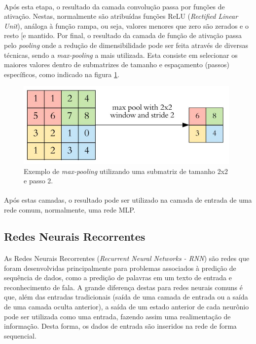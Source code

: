 \documentclass[grad,numbers]{coppe}
\begin{document}
  		\paragraph{}Após esta etapa, o resultado da camada convolução passa por funções de ativação. Nestas, normalmente são atribuídas funções ReLU (\textit{Rectified Linear Unit}), análoga à função rampa, ou seja, valores menores que zero são zerados e o resto [e mantido. Por final, o resultado da camada de função de ativação passa pelo \textit{pooling} onde a redução de dimensibilidade pode ser feita através de diversas técnicas, sendo a \textit{max-pooling} a mais utilizada. Esta consiste em selecionar os maiores valores dentro de submatrizes de tamanho e espaçamento (passos) específicos, como indicado na figura \ref{fig:pooling-fig}.
  		\begin{figure}[h]
  			\centering
  			\includegraphics[width=11cm]{pooling.jpg}
  			\caption{Exemplo de \textit{max-pooling} utilizando uma submatriz de tamanho 2x2 e passo 2\cite{kernel-example}.}
  			\label{fig:pooling-fig}
  		\end{figure}
  		\paragraph{}Após estas camadas, o resultado pode ser utilizado na camada de entrada de uma rede comum, normalmente, uma rede MLP.
	  \subsection{Redes Neurais Recorrentes}
	  	\paragraph{}As Redes Neurais Recorrentes (\textit{Recurrent Neural Networks - RNN}) são redes que foram desenvolvidas principalmente para problemas associados à predição de sequência de dados, como a predição de palavras em um texto de entrada e reconhecimento de fala\cite{rnn-on-speech}. A grande diferença destas para redes neurais comuns é que, além das entradas tradicionais (saída de uma camada de entrada ou a saída de uma camada oculta anterior), a saída de um estado anterior de cada neurônio pode ser utilizada como uma entrada, fazendo assim uma realimentação de informação. Desta forma, os dados de entrada são inseridos na rede de forma sequencial.
\end{document}
